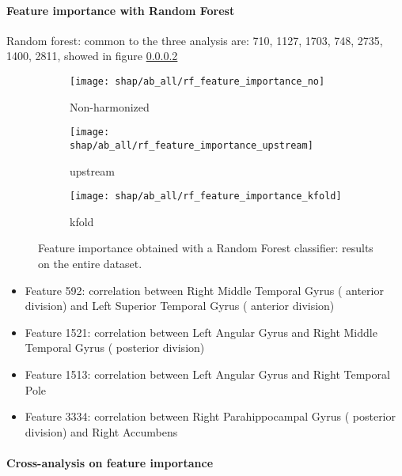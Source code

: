 \documentclass[12pt]{report}
\begin{document}
\paragraph{Feature importance with Random Forest}


Random forest: common to the three analysis are: 710, 1127, 1703, 748, 2735, 1400, 2811, showed in figure \ref{}


\begin{figure}
\centering
\begin{subfigure}[b]{.45\textwidth}
   \texttt{[image: shap/ab\_all/rf\_feature\_importance\_no]}
   \caption{Non-harmonized}
   \label{}
\end{subfigure}
\begin{subfigure}[b]{.45\textwidth}
   \texttt{[image: shap/ab\_all/rf\_feature\_importance\_upstream]}
   \caption{upstream}
   \label{}
\end{subfigure}
\begin{subfigure}[b]{.45\textwidth}
   \texttt{[image: shap/ab\_all/rf\_feature\_importance\_kfold]}
   \caption{kfold}
   \label{}
\end{subfigure}
\caption{Feature importance obtained with a Random Forest classifier: results on the entire dataset.}
\label{fig:shap_ab1}
\end{figure}



\begin{itemize}
\item Feature 592: correlation between Right Middle Temporal Gyrus ( anterior division) and Left Superior Temporal Gyrus ( anterior division)
\item Feature 1521: correlation between Left Angular Gyrus  and Right Middle Temporal Gyrus ( posterior division)
\item Feature 1513: correlation between Left Angular Gyrus  and Right Temporal Pole
\item Feature 3334: correlation between Right Parahippocampal Gyrus ( posterior division) and Right Accumbens
\end{itemize}


\paragraph{Cross-analysis on feature importance}
\end{document}
